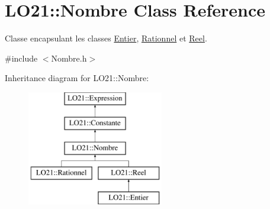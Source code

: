\hypertarget{class_l_o21_1_1_nombre}{\section{\-L\-O21\-:\-:\-Nombre \-Class \-Reference}
\label{class_l_o21_1_1_nombre}
}


\-Classe encapsulant les classes \hyperlink{class_l_o21_1_1_entier}{\-Entier}, \hyperlink{class_l_o21_1_1_rationnel}{\-Rationnel} et \hyperlink{class_l_o21_1_1_reel}{\-Reel}.  




{\ttfamily \#include $<$\-Nombre.\-h$>$}

\-Inheritance diagram for \-L\-O21\-:\-:\-Nombre\-:\begin{figure}[H]
\begin{center}
\leavevmode
\includegraphics[height=5.000000cm]{class_l_o21_1_1_nombre}
\end{center}
\end{figure}
